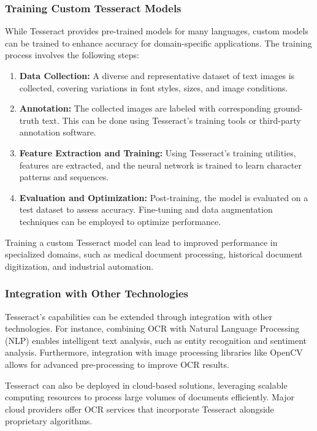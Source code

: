 \subsubsection{Training Custom Tesseract Models}

While Tesseract provides pre-trained models for many languages, custom models can be trained to enhance accuracy for domain-specific applications. The training process involves the following steps:

\begin{enumerate}
    \item \textbf{Data Collection:} A diverse and representative dataset of text images is collected, covering variations in font styles, sizes, and image conditions.
    
    \item \textbf{Annotation:} The collected images are labeled with corresponding ground-truth text. This can be done using Tesseract's training tools or third-party annotation software.
    
    \item \textbf{Feature Extraction and Training:} Using Tesseract's training utilities, features are extracted, and the neural network is trained to learn character patterns and sequences.
    
    \item \textbf{Evaluation and Optimization:} Post-training, the model is evaluated on a test dataset to assess accuracy. Fine-tuning and data augmentation techniques can be employed to optimize performance.
\end{enumerate}

Training a custom Tesseract model can lead to improved performance in specialized domains, such as medical document processing, historical document digitization, and industrial automation.

\subsubsection{Integration with Other Technologies}

Tesseract's capabilities can be extended through integration with other technologies. For instance, combining OCR with Natural Language Processing (NLP) enables intelligent text analysis, such as entity recognition and sentiment analysis. Furthermore, integration with image processing libraries like OpenCV allows for advanced pre-processing to improve OCR results.

Tesseract can also be deployed in cloud-based solutions, leveraging scalable computing resources to process large volumes of documents efficiently. Major cloud providers offer OCR services that incorporate Tesseract alongside proprietary algorithms.

